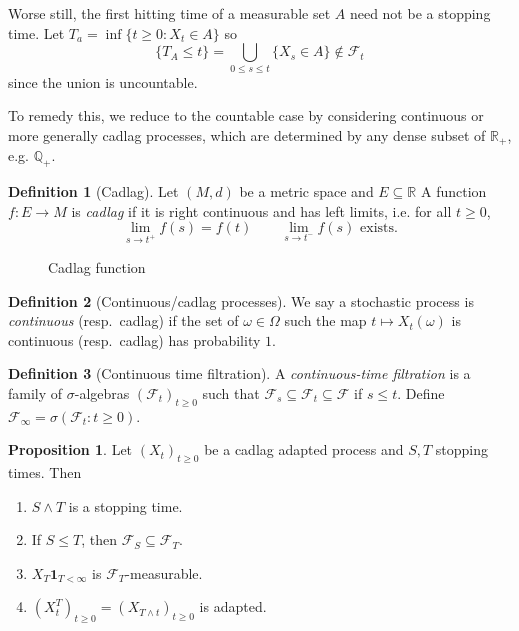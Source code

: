 \documentclass[parskip=full]{article}
\theoremstyle{definition}
\newtheorem*{definition}{Definition}
\newtheorem{proposition}{Proposition}[section]
\newcommand{\R}{\mathbb{R}}
\newcommand{\Q}{\mathbb{Q}}
\newcommand{\1}{\mathbbm{1}}
\begin{document}
Worse still, the first hitting time of a measurable set $A$ need not be a stopping time. Let $T_a = \inf\{t \geq 0: X_t \in A\}$ so 
\[
  \{T_A \leq t\} = \bigcup_{0 \leq s \leq t} \{X_s \in A\} \notin \mathcal{F}_t
\]
since the union is uncountable.

To remedy this, we reduce to the countable case by considering continuous or more generally cadlag processes, which are determined by any dense subset of $\R_+$, e.g. $\Q_+$.

\begin{definition}[Cadlag]
  Let $(M,d)$ be a metric space and $E\subseteq \R$ A function $f: E \to M$ is \emph{cadlag} if it is right continuous and has left limits, i.e. for all $t \geq 0$,
  \[
    \lim_{s \to t^+} f(s) = f(t) \qquad \lim_{s \to t^-} f(s) \text{ exists}.
  \]
\end{definition}

\begin{figure}[h]
  \centering
  \caption{Cadlag function}
\end{figure}

\begin{definition}[Continuous/cadlag processes]
  We say a stochastic process is \emph{continuous} (resp.\ cadlag) if the set of $\omega \in \Omega$ such the map $t \mapsto X_t (\omega)$ is continuous (resp.\ cadlag) has probability $1$.
\end{definition}

\begin{definition}[Continuous time filtration]
  A \emph{continuous-time filtration} is a family of $\sigma$-algebras $(\mathcal{F}_t)_{t \geq 0}$ such that $\mathcal{F}_s \subseteq \mathcal{F}_t \subseteq \mathcal{F}$ if $s \leq t$. Define $\mathcal{F}_\infty = \sigma(\mathcal{F}_t: t \geq 0)$.
\end{definition}

\begin{proposition}
  Let $(X_t)_{t \geq 0}$ be a cadlag adapted process and $S, T$ stopping times. Then
  \begin{enumerate}
    \item $S \wedge T$ is a stopping time.
    \item If $S \leq T$, then $\mathcal{F}_S \subseteq \mathcal{F}_T$.
    \item $X_T \mathbf{1}_{T < \infty}$ is $\mathcal{F}_T$-measurable.
    \item $(X_t^T)_{t \geq 0} = (X_{T \wedge t})_{t \geq 0}$ is adapted.
  \end{enumerate}
\end{proposition}
\end{document}
